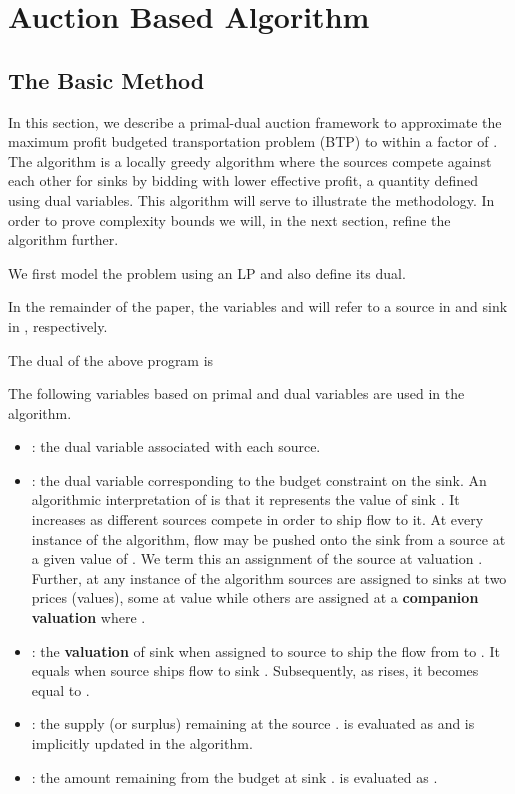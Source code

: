 \documentclass[11pt]{article}
\newcounter{rem}
\newcommand{\ignore}[1]{ }
\begin{document}
\section{Auction Based Algorithm}
\label{sec_auc}
\subsection{The Basic Method}
\label{sec_basic}

In this section, we describe a primal-dual auction framework to 
approximate the maximum profit 
budgeted transportation problem (BTP) to within a factor of . 
The algorithm is a locally greedy algorithm 
where the sources compete against each other for sinks by bidding with lower 
effective 
profit, a quantity defined using dual variables. 
This algorithm will serve to illustrate the methodology. In order to prove
complexity bounds we will, in the next section, refine the algorithm further.

We first model the problem using an LP and also define its dual.


In the remainder of the paper, the variables  and  will refer to
a  source  in  and sink  in , respectively.

The dual of the above program is 




\ignore{
The algorithm maintains a pair of feasible dual and primal
solutions. It works to modify them until all the 
complementary slackness conditions are exactly or 
approximately satisfied.

}

The following variables based on primal and dual variables are
used in the algorithm.

\begin{itemize}
\item
 : the dual variable associated with each source.
\item
 : the dual variable corresponding to the budget constraint on the sink. 
An algorithmic interpretation of  is that it represents
the value of sink . It increases as different sources compete in order to ship flow to it.
At every instance of the algorithm, flow may be pushed onto the sink  
from a source at a given
value of . We term this an assignment of the source at valuation .
Further, at any instance of the algorithm sources are assigned to sinks at two prices (values),
some at value  while others are assigned at 
a {\bf companion valuation}  where 
. 

\item
:  the {\bf valuation} of sink  when assigned to source 
 to ship the flow from  to . It equals   when source  ships
flow to sink .  Subsequently, as  rises, it becomes equal to .
\item
 : the supply (or surplus) remaining at the source .  is  
evaluated as  
 and is implicitly updated in the algorithm.
\item
 : the amount remaining from the budget at sink .
 is evaluated as .
\end{itemize}
\end{document}
